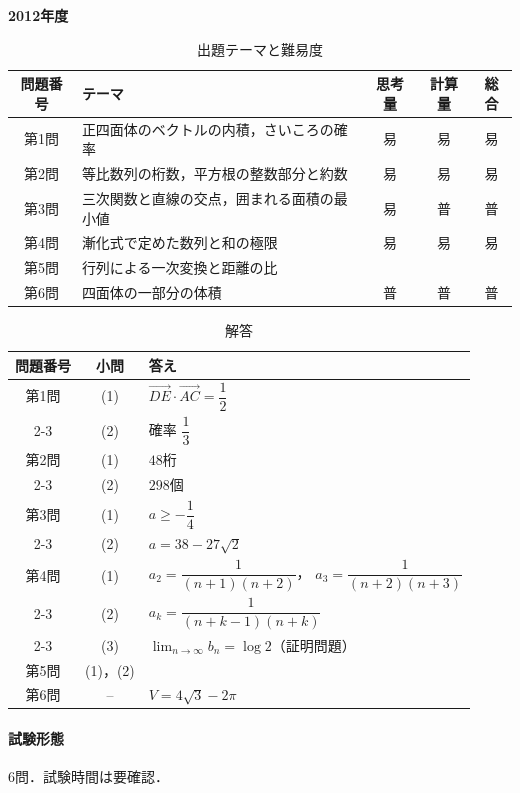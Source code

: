 \documentclass[../../main.tex]{subfiles}
\begin{document}
\begin{center}
  {\fontsize{48pt}{58pt}\selectfont \textbf{2012}\normalsize\textbf{年度}}
\end{center}

\begin{table}[htb]
  \centering
  \caption{出題テーマと難易度}
  \begin{tabular}{|c|p{6.2cm}|c|c|c|}
    \hline
    \textbf{問題番号} & \textbf{テーマ} & \textbf{思考量} & \textbf{計算量} & \textbf{総合} \\
    \hline
    第1問 & 正四面体のベクトルの内積，さいころの確率 & 易 & 易 & 易 \\
    \hline
    第2問 & 等比数列の桁数，平方根の整数部分と約数 & 易 & 易 & 易 \\
    \hline
    第3問 & 三次関数と直線の交点，囲まれる面積の最小値 & 易 & 普 & 普 \\
    \hline
    第4問 & 漸化式で定めた数列と和の極限 & 易 & 易 & 易 \\
    \hline
    第5問 & 行列による一次変換と距離の比 &  &  &  \\
    \hline
    第6問 & 四面体の一部分の体積 & 普 & 普 & 普 \\
    \hline
  \end{tabular}
\end{table}

\begin{table}[htb]
  \centering
  \caption{解答}
  \renewcommand{\arraystretch}{1.4}
  \begin{tabular}{|c|c|p{9cm}|}
    \hline
    \textbf{問題番号} & \textbf{小問} & \textbf{答え} \\
    \hline
    第1問 & (1) & $\overrightarrow{DE}\cdot\overrightarrow{AC}=\dfrac{1}{2}$ \\
    \cline{2-3}
    & (2) & 確率 $\dfrac{1}{3}$ \\
    \hline
    第2問 & (1) & $48$桁 \\
    \cline{2-3}
    & (2) & $298$個 \\
    \hline
    第3問 & (1) & $a\ge-\dfrac{1}{4}$ \\
    \cline{2-3}
    & (2) & $a=38-27\sqrt{2}$ \\
    \hline
    第4問 & (1) & $a_2=\dfrac{1}{(n+1)(n+2)}$，
    $a_3=\dfrac{1}{(n+2)(n+3)}$ \\
    \cline{2-3}
    & (2) & $a_k=\dfrac{1}{(n+k-1)(n+k)}$ \\
    \cline{2-3}
    & (3) & $\displaystyle\lim_{n\to\infty}b_n=\log 2$（証明問題） \\
    \hline
    第5問 & (1)，(2) & \\
    \hline
    第6問 & -- & $V=4\sqrt{3}-2\pi$ \\
    \hline
  \end{tabular}
\end{table}

\paragraph{試験形態}
6問．試験時間は要確認．
\end{document}
